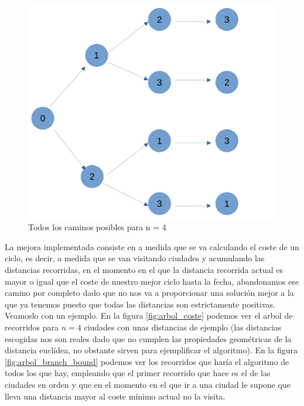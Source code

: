 \documentclass{article}
\begin{document}
\begin{figure}[!hbt]
    \centering
    \includegraphics[scale=0.2]{P3/Prosa/permutacion.png}
    \caption{\centering Todos los caminos posibles para n = 4}
    \label{fig:permutacion}
\end{figure}
La mejora implementada consiste en a medida que se va calculando el coste de un ciclo, es decir, a medida que se van visitando ciudades y acumulando las distancias recorridas, en el momento en el que la distancia recorrida actual es mayor o igual que el coste de nuestro mejor ciclo hasta la fecha, abandonamos ese camino por completo dado que no nos va a proporcionar una solución mejor a la que ya tenemos puesto que todas las distancias son estrictamente positivas.
\newline
Veamoslo con un ejemplo. En la figura \ref{fig:arbol_coste} podemos ver el arbol de recorridos para $n=4$ ciudades con unas distancias de ejemplo (las distancias escogidas nos son reales dado que no cumplen las propiedades geométricas de la distancia euclídea, no obstante sirven para ejemplificar el algoritmo). En la figura \ref{fig:arbol_branch_bound} podemos ver los recorridos que haría el algoritmo de todos los que hay, empleando que el primer recorrido que hace es el de las ciudades en orden y que en el momento en el que ir a una ciudad le supone que lleva una distancia mayor al coste mínimo actual no la visita.
\newline
\end{document}
